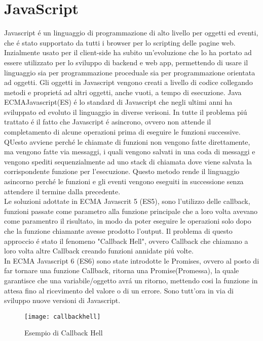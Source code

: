 \section{JavaScript}
Javascript \'e un linguaggio di programmazione di alto livello per oggetti ed eventi, che \'e stato supportato da tutti i browser
per lo scripting delle pagine web.
Inzialmente usato per il client-side ha subito un'evoluzione che lo ha portato ad essere utilizzato per lo sviluppo di backend e web app,
permettendo di usare il linguaggio sia per programmazione proceduale sia per programmazione orientata ad oggetti.
Gli oggetti in Javascript vengono creati a livello di codice collegando metodi e propriet\'a ad altri oggetti, anche vuoti, a tempo
di esecuzione.
Java
\\[2\baselineskip]
ECMAJavascript(ES) \'e lo standard di Javascript che negli ultimi anni ha sviluppato ed evoluto il linguaggio in diverse verisoni.
In tutte il problema pi\'u trattato \'e il fatto che Javascript \'e asincrono, ovvero non attende il completamento di alcune
operazioni prima di eseguire le funzioni successive. QUesto avviene perch\'e le chiamate di funzioni non vengono fatte direttamente, ma vengono
fatte via messaggi, i quali vengono salvati in una coda di messaggi e vengono spediti sequenzialmente ad uno stack di chiamata dove
viene salvata la corrispondente funzione per l'esecuzione. Questo metodo rende il linguaggio asincorno perch\'e le funzioni e gli eventi
vengono eseguiti in successione senza attendere il termine dalla precedente.
\\[1\baselineskip]Le soluzioni adottate in ECMA Javascrit 5 (ES5), sono l'utilizzo delle callback,
funzioni passate come parametro alla funzione principale che a loro volta avevano come paramentro il risultato, in modo da poter eseguire le operazioni
solo dopo che la funzione chiamante avesse prodotto l'output. Il problema di questo approccio \'e stato il fenomeno "Callback Hell", ovvero Callback che chiamano a loro volta
altre Callback creando funzioni annidate pi\'u volte.
\\[1\baselineskip]
In ECMA Javascript 6 (ES6) sono state introdotte le Promises, ovvero al posto di far tornare una funzione Callback, ritorna una Promise(Promessa),
la quale garantisce che una variabile/oggetto avr\'a un ritorno, mettendo cosi la funzione in attesa fino al ricevimento del valore o di un errore.
Sono tutt'ora in via di sviluppo nuove versioni di Javascript.
\\[2\baselineskip]
\begin{figure}[h]
    \texttt{[image: callbackhell]}
    \caption{Esempio di Callback Hell}
\end{figure}

